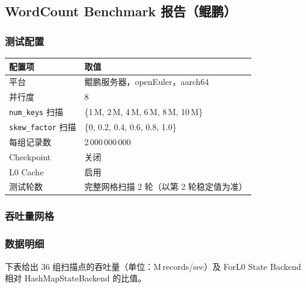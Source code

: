 \documentclass[a4paper,11pt]{article}
\newcommand{\project}{ForL0 State Backend}
\begin{document}
\subsection{WordCount Benchmark 报告（鲲鹏）}

\subsubsection{测试配置}

\begin{table}[H]
\centering
\small
\begin{tabularx}{\textwidth}{L{3.4cm} X}
\toprule
\textbf{配置项} & \textbf{取值} \\
\midrule
平台                   & 鲲鹏服务器，openEuler，aarch64 \\
并行度                 & 8 \\
\texttt{num\_keys} 扫描 & \{1\,M, 2\,M, 4\,M, 6\,M, 8\,M, 10\,M\} \\
\texttt{skew\_factor} 扫描 & \{0, 0.2, 0.4, 0.6, 0.8, 1.0\} \\
每组记录数             & 2\,000\,000\,000 \\
Checkpoint             & 关闭 \\
L0 Cache               & 启用 \\
测试轮数               & 完整网格扫描 2 轮（以第 2 轮稳定值为准） \\
\bottomrule
\end{tabularx}
\end{table}

\subsubsection{吞吐量网格}


\FloatBarrier

\subsubsection{数据明细}

下表给出 36 组扫描点的吞吐量（单位：M\,records/sec）及 \project{} 相对 HashMapStateBackend 的比值。
\end{document}
